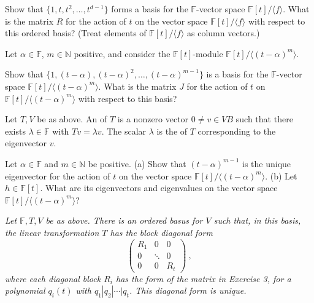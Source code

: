 \documentclass[12pt]{article}
\newcommand{\FF}{{\mathbb F}}
\newcommand{\NN}{{\mathbb N}}
\def\demph#1{{\color{blue}{\sl #1}}}
\def\defcolor#1{{\color{blue}#1}}
\begin{document}
\noindent
    {\color{brown}{\bf Exercise 3:} }  Show that $\{1,t,t^2,\dotsc,t^{d-1}\}$ forms a basis for the
      $\FF$-vector space $\FF[t]/\langle f\rangle$.\newline
      What is the matrix \defcolor{$R$} for the action of $t$ on the vector space $\FF[t]/\langle f\rangle$ with respect to this ordered
      basis?\newline 
      (Treat elements of  $\FF[t]/\langle f\rangle$ as column vectors.)\medskip

Let $\alpha\in\FF$, $m\in\NN$ positive, and consider the $\FF[t]$-module $\FF[t]/\langle(t-\alpha)^m\rangle$.


\noindent
    {\color{brown}{\bf Exercise 4:} }
    Show that $\{1, (t-\alpha), (t-\alpha)^2,\dotsc,(t-\alpha)^{m-1}\}$ is a basis for the $\FF$-vector space
    $\FF[t]/\langle(t-\alpha)^m\rangle$.\newline
    What is the matrix \defcolor{$J$} for the action of $t$ on  $\FF[t]/\langle(t-\alpha)^m\rangle$ with respect to this basis?\medskip


\noindent
    {\color{brown}{\bf Definition.} }  Let $T,V$ be as above.
    An \demph{eigenvector} of $T$ is a nonzero vector $0\neq v\in VB$ such that there exists $\lambda\in\FF$ with $Tv=\lambda v$.
    The scalar $\lambda$ is the \demph{eigenvalue} of $T$ corresponding to the eigenvector $v$.

\noindent
    {\color{brown}{\bf Exercise 5:} }
    Let $\alpha\in\FF$ and $m\in\NN$ be positive.\newline
    (a) Show that $(t{-}\alpha)^{m-1}$ is the unique eigenvector for the action of $t$ on
    the vector space $\FF[t]/\langle(t-\alpha)^m\rangle$.\newline
    (b) Let $h\in\FF[t]$.
        What are its eigenvectors and eigenvalues on the vector space $\FF[t]/\langle(t-\alpha)^m\rangle$?\medskip

\noindent
    {\color{brown}{\bf Theorem. (Rational Canonical Form)} }
    {\sl Let $\FF,T,V$ be as above.
      There is an ordered basus for $V$ such that, in this basis, the linear transformation $T$ has the block diagonal form
\[
    \left(\begin{matrix} R_1 &   0  & 0 \\
                          0  &\ddots& 0 \\
                          0  &   0  &R_t\end{matrix}\right )\ ,
\]
where each diagonal block $R_i$ has the form of the matrix in Exercise 3, for a polynomial $q_i(t)$ with
$q_1|q_2|\dotsb|q_t$.
This diagonal form is unique.}
\end{document}

